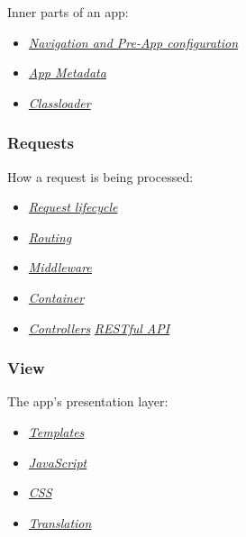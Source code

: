 \documentclass[letterpaper,10pt,english]{sphinxmanual}
\begin{document}
Inner parts of an app:
\begin{itemize}
\item {} 
{\hyperref[app/init::doc]{\emph{\emph{Navigation and Pre-App configuration}}}}

\item {} 
{\hyperref[app/info::doc]{\emph{\emph{App Metadata}}}}

\item {} 
{\hyperref[app/classloader::doc]{\emph{\emph{Classloader}}}}

\end{itemize}


\subsubsection{Requests}
\label{app/index:requests}
How a request is being processed:
\begin{itemize}
\item {} 
{\hyperref[app/request::doc]{\emph{\emph{Request lifecycle}}}}

\item {} 
{\hyperref[app/routes::doc]{\emph{\emph{Routing}}}}

\item {} 
{\hyperref[app/middleware::doc]{\emph{\emph{Middleware}}}}

\item {} 
{\hyperref[app/container::doc]{\emph{\emph{Container}}}}

\item {} 
{\hyperref[app/controllers::doc]{\emph{\emph{Controllers}}}} \textbar{} {\hyperref[app/api::doc]{\emph{\emph{RESTful API}}}}

\end{itemize}


\subsubsection{View}
\label{app/index:view}
The app's presentation layer:
\begin{itemize}
\item {} 
{\hyperref[app/templates::doc]{\emph{\emph{Templates}}}}

\item {} 
{\hyperref[app/js::doc]{\emph{\emph{JavaScript}}}}

\item {} 
{\hyperref[app/css::doc]{\emph{\emph{CSS}}}}

\item {} 
{\hyperref[app/l10n::doc]{\emph{\emph{Translation}}}}

\end{itemize}
\end{document}
